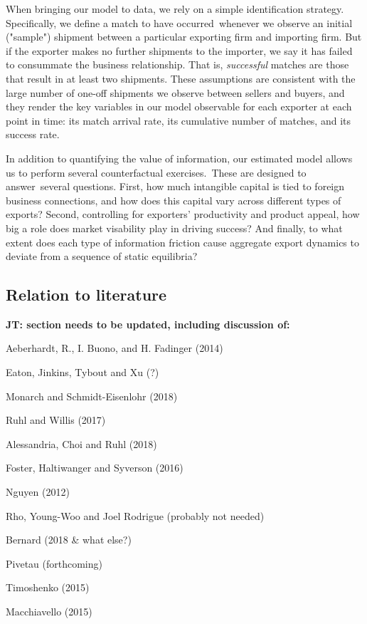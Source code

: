\documentclass[12pt]{article}
\begin{document}
When bringing our model to data, we rely on a simple identification
strategy. Specifically, we define a match to have occurred\ whenever we
observe an initial ("sample") shipment between a particular exporting firm
and importing firm. But if the exporter makes no further shipments to the
importer, we say it has failed to consummate the business relationship. That
is, \textit{successful} matches are those that result in at least two
shipments. These assumptions are consistent with the large number of one-off
shipments we observe between sellers and buyers, and they render the key
variables in our model observable for each exporter at each point in time:
its match arrival rate, its cumulative number of matches, and its success
rate.

In addition to quantifying the value of information, our estimated model
allows us to perform several counterfactual exercises.\ These are designed
to answer\ several questions. First, how much intangible capital is tied to
foreign business connections, and how does this capital vary across
different types of exports? Second, controlling for exporters' productivity
and product appeal, how big a role does market visability play in driving
success? And finally, to what extent does each type of information friction
cause aggregate export dynamics to deviate from a sequence of static
equilibria?

\subsection{Relation to literature}

\textbf{JT: section needs to be updated, including discussion of:}

Aeberhardt, R., I. Buono, and H. Fadinger (2014)

Eaton, Jinkins, Tybout and Xu (?)

Monarch and Schmidt-Eisenlohr (2018)

Ruhl and Willis (2017)

Alessandria, Choi and Ruhl (2018)

Foster, Haltiwanger and Syverson (2016)

Nguyen (2012)

Rho, Young-Woo and Joel Rodrigue (probably not needed)

Bernard (2018 \& what else?)

Pivetau (forthcoming)

Timoshenko (2015)

Macchiavello (2015)
\end{document}
